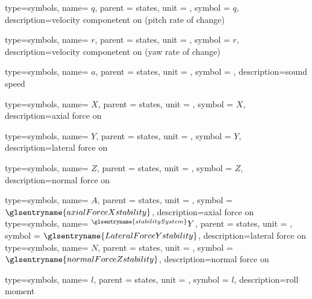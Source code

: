 {type=symbols,
  name= \ensuremath{q},
  parent = {states},
  unit = \unexpanded{\si{\radian\per\second}},
  symbol = \ensuremath{q},
  description={velocity componetent on  (pitch rate of change)}
}

{type=symbols,
  name= \ensuremath{r},
  parent = {states},
  unit = \unexpanded{\si{\radian\per\second}},
  symbol = \ensuremath{r},
  description={velocity componetent on  (yaw rate of change)}
}

{type=symbols,
  name= \ensuremath{a},
  parent = {states},
  unit = \unexpanded{\si{\meter\per\second}},
  symbol = ,
  description={sound speed}
}

{type=symbols,
  name= \ensuremath{X},
  parent = {states},
  unit = \unexpanded{\si{\newton}},
  symbol = \ensuremath{X},
  description={axial force on }
}

{type=symbols,
  name= \ensuremath{Y},
  parent = {states},
  unit = \unexpanded{\si{\newton}},
  symbol = \ensuremath{Y},
  description={lateral force on }
}



{type=symbols,
  name= \ensuremath{Z},
  parent = {states},
  unit = \unexpanded{\si{\newton}},
  symbol = \ensuremath{Z},
  description={normal force on }
}

{type=symbols,
  name= \ensuremath{A},
  parent = {states},
  unit = \unexpanded{\si{\newton}},
  symbol = \ensuremath{\glsentryname{axialForceXstability}},
  description={axial force on }
}
{type=symbols,
  name= \ensuremath{{}^{\glsentryname{stabilitySystem}}Y},
  parent = {states},
  unit = \unexpanded{\si{\newton}},
  symbol = \ensuremath{\glsentryname{LateralForceYstability}},
  description={lateral force on }
}
{type=symbols,
  name= \ensuremath{N},
  parent = {states},
  unit = \unexpanded{\si{\newton}},
  symbol = \ensuremath{\glsentryname{normalForceZstability}},
  description={normal force on }
}


{type=symbols,
  name= \ensuremath{l},
  parent = {states},
  unit = \unexpanded{\si{\newton\meter}},
  symbol = \ensuremath{l},
  description={roll moment}
}


